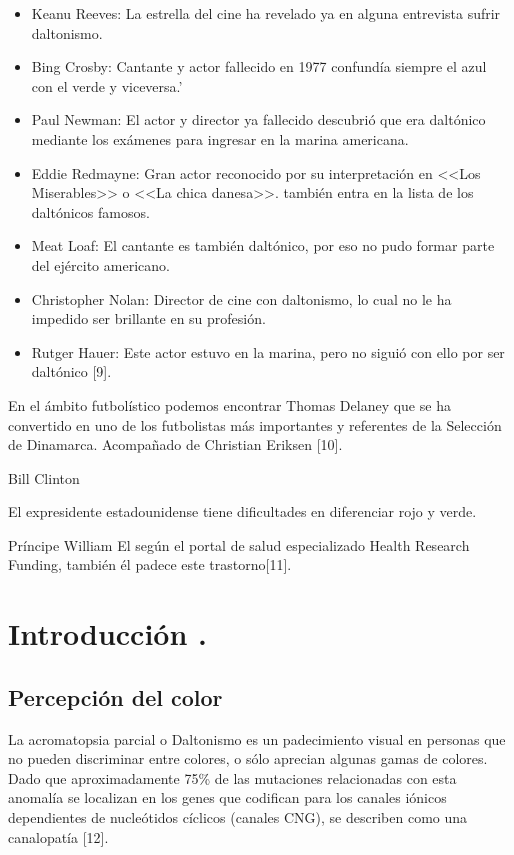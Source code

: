 \documentclass[10pt]{article}
\begin{document}
\setlength{\parskip}{2mm}
\begin{itemize}
    \item Keanu Reeves: La estrella del cine ha revelado ya en alguna entrevista sufrir daltonismo.
    \item Bing Crosby: Cantante y actor fallecido en 1977 confundía siempre el azul con el verde y viceversa.'
    \item Paul Newman: El actor y director ya fallecido descubrió que era daltónico mediante los exámenes para ingresar en la marina americana.
    \item Eddie Redmayne: Gran actor reconocido por su interpretación en <<Los Miserables>> o <<La chica danesa>>. también entra en la lista de los daltónicos famosos.
    \item Meat Loaf: El cantante es también daltónico, por eso no pudo formar parte del ejército americano.
    \item Christopher Nolan: Director de cine con daltonismo, lo cual no le ha impedido ser brillante en su profesión.
    \item Rutger Hauer: Este actor estuvo en la marina, pero no siguió con ello por ser daltónico [9].
\end{itemize}

En el ámbito futbolístico podemos encontrar 
Thomas Delaney que se ha convertido en uno de los futbolistas más importantes y referentes de la Selección de Dinamarca. Acompañado de Christian Eriksen [10].
\setlength{\parskip}{2mm}

Bill Clinton

El expresidente estadounidense tiene dificultades en diferenciar rojo y verde.

\setlength{\parskip}{2mm}

Príncipe William
El según el portal de salud especializado Health Research Funding, también él padece este trastorno[11].

\section{Introducción .}
\subsection{Percepción del color} 

La acromatopsia parcial o Daltonismo es un padecimiento visual en personas que no pueden discriminar entre colores, o sólo aprecian algunas gamas de colores. Dado que aproximadamente 75\% de las mutaciones relacionadas con esta anomalía se localizan en los genes que codifican para los canales iónicos dependientes de nucleótidos cíclicos (canales CNG), se describen como una canalopatía [12].
\end{document}
